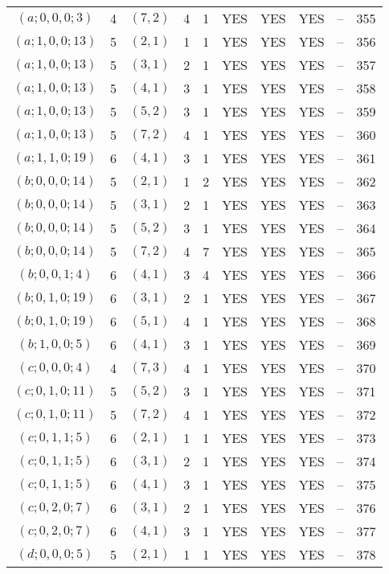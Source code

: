 \begin{longtable}{|c|c|c|c|c|c|c|c|c|c|}
$(a; 0, 0, 0; 3)$ & 4 & $(7, 2)$ & 4 & 1 & YES & YES & YES & -- & 355\\
$(a; 1, 0, 0; 13)$ & 5 & $(2, 1)$ & 1 & 1 & YES & YES & YES & -- & 356\\
$(a; 1, 0, 0; 13)$ & 5 & $(3, 1)$ & 2 & 1 & YES & YES & YES & -- & 357\\
$(a; 1, 0, 0; 13)$ & 5 & $(4, 1)$ & 3 & 1 & YES & YES & YES & -- & 358\\
$(a; 1, 0, 0; 13)$ & 5 & $(5, 2)$ & 3 & 1 & YES & YES & YES & -- & 359\\
$(a; 1, 0, 0; 13)$ & 5 & $(7, 2)$ & 4 & 1 & YES & YES & YES & -- & 360\\
$(a; 1, 1, 0; 19)$ & 6 & $(4, 1)$ & 3 & 1 & YES & YES & YES & -- & 361\\
$(b; 0, 0, 0; 14)$ & 5 & $(2, 1)$ & 1 & 2 & YES & YES & YES & -- & 362\\
$(b; 0, 0, 0; 14)$ & 5 & $(3, 1)$ & 2 & 1 & YES & YES & YES & -- & 363\\
$(b; 0, 0, 0; 14)$ & 5 & $(5, 2)$ & 3 & 1 & YES & YES & YES & -- & 364\\
$(b; 0, 0, 0; 14)$ & 5 & $(7, 2)$ & 4 & 7 & YES & YES & YES & -- & 365\\
$(b; 0, 0, 1; 4)$ & 6 & $(4, 1)$ & 3 & 4 & YES & YES & YES & -- & 366\\
$(b; 0, 1, 0; 19)$ & 6 & $(3, 1)$ & 2 & 1 & YES & YES & YES & -- & 367\\
$(b; 0, 1, 0; 19)$ & 6 & $(5, 1)$ & 4 & 1 & YES & YES & YES & -- & 368\\
$(b; 1, 0, 0; 5)$ & 6 & $(4, 1)$ & 3 & 1 & YES & YES & YES & -- & 369\\
$(c; 0, 0, 0; 4)$ & 4 & $(7, 3)$ & 4 & 1 & YES & YES & YES & -- & 370\\
$(c; 0, 1, 0; 11)$ & 5 & $(5, 2)$ & 3 & 1 & YES & YES & YES & -- & 371\\
$(c; 0, 1, 0; 11)$ & 5 & $(7, 2)$ & 4 & 1 & YES & YES & YES & -- & 372\\
$(c; 0, 1, 1; 5)$ & 6 & $(2, 1)$ & 1 & 1 & YES & YES & YES & -- & 373\\
$(c; 0, 1, 1; 5)$ & 6 & $(3, 1)$ & 2 & 1 & YES & YES & YES & -- & 374\\
$(c; 0, 1, 1; 5)$ & 6 & $(4, 1)$ & 3 & 1 & YES & YES & YES & -- & 375\\
$(c; 0, 2, 0; 7)$ & 6 & $(3, 1)$ & 2 & 1 & YES & YES & YES & -- & 376\\
$(c; 0, 2, 0; 7)$ & 6 & $(4, 1)$ & 3 & 1 & YES & YES & YES & -- & 377\\
$(d; 0, 0, 0; 5)$ & 5 & $(2, 1)$ & 1 & 1 & YES & YES & YES & -- & 378\\

\end{longtable}
